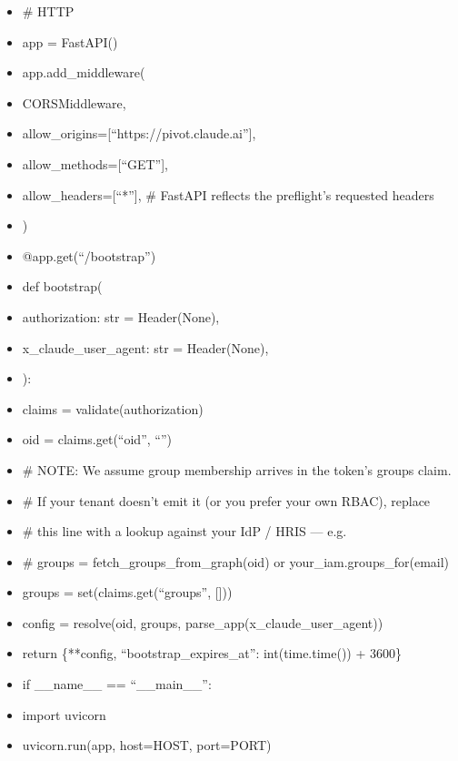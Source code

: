 \documentclass[11pt]{article}
\begin{document}
\begin{itemize}[leftmargin=*,itemsep=2pt,topsep=2pt]
\item {} \# HTTP
\item {} app = FastAPI()
\item {} app.add\_\allowbreak{}middleware(
\item {} CORSMiddleware,
\item {} allow\_\allowbreak{}origins=[``https://pivot.claude.ai''],
\item {} allow\_\allowbreak{}methods=[``GET''],
\item {} allow\_\allowbreak{}headers=[``*''], \# FastAPI reflects the preflight's requested headers
\item {} )
\item {} @app.get(``/bootstrap'')
\item {} def bootstrap(
\item {} authorization: str = Header(None),
\item {} x\_\allowbreak{}claude\_\allowbreak{}user\_\allowbreak{}agent: str = Header(None),
\item {} ):
\item {} claims = validate(authorization)
\item {} oid = claims.get(``oid'', ``'')
\item {} \# NOTE: We assume group membership arrives in the token's groups claim.
\item {} \# If your tenant doesn't emit it (or you prefer your own RBAC), replace
\item {} \# this line with a lookup against your IdP / HRIS — e.g.
\item {} \# groups = fetch\_\allowbreak{}groups\_\allowbreak{}from\_\allowbreak{}graph(oid) or your\_\allowbreak{}iam.groups\_\allowbreak{}for(email)
\item {} groups = set(claims.get(``groups'', []))
\item {} config = resolve(oid, groups, parse\_\allowbreak{}app(x\_\allowbreak{}claude\_\allowbreak{}user\_\allowbreak{}agent))
\item {} return \{**config, ``bootstrap\_\allowbreak{}expires\_\allowbreak{}at'': int(time.time()) + 3600\}
\item {} if \_\allowbreak{}\_\allowbreak{}name\_\allowbreak{}\_\allowbreak{} == ``\_\allowbreak{}\_\allowbreak{}main\_\allowbreak{}\_\allowbreak{}'':
\item {} import uvicorn
\item {} uvicorn.run(app, host=HOST, port=PORT)
\end{itemize}
\end{document}
